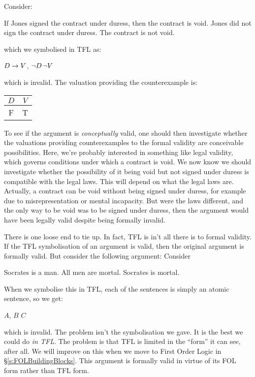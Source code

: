 Consider:
%
\begin{earg}
\prem If Jones signed the contract under duress, then the
contract is void.
\prem Jones did not sign the contract under duress.
\conc The contract is not void.
\end{earg}which we symbolised in TFL as:
\begin{center}
$D\rightarrow V$,\; $\neg D$\;\therefore\;$\neg V$
\end{center}
which is invalid. The valuation providing the counterexample is:
\begin{tabular}{cc}
$D$&$V$\\\hline
F&T
\end{tabular} To see if the argument is \emph{conceptually} valid, one should then investigate whether the valuations providing counterexamples to the formal validity are conceivable possibilities. Here, we're probably interested in something like legal validity, which governs conditions under which a contract is void. We now know we should investigate whether the possibility of it being void but not signed under duress is compatible with the legal laws.
This will depend on what the legal laws are.
Actually, a contract can be void without being signed under duress, for example due to misrepresentation or mental incapacity.
But were the laws different, and the only way to be void was to be signed under duress, then the argument would have been legally valid despite being formally invalid.


There is one loose end to tie up. In fact, TFL is in't all there is to formal validity.
If the TFL symbolisation of an argument is valid, then the original argument is formally valid. But consider the following argument:
Consider
\begin{earg}
\prem Socrates is a man.
\prem All men are mortal.
\conc Socrates is mortal.
\end{earg}
When we symbolise this in TFL, each of the sentences is simply an atomic sentence, so we get:
\begin{center}
$A$, $B$\; \therefore \; $C$
\end{center}
which is invalid.
The problem isn't the symbolisation we gave. It is the best we could do \emph{in TFL}. The problem is that TFL is limited in the ``form'' it can see, after all. We will improve on this when we move to First Order Logic in \S\ref{s:FOLBuildingBlocks}.
This argument is formally valid in virtue of its FOL form rather than TFL form.

